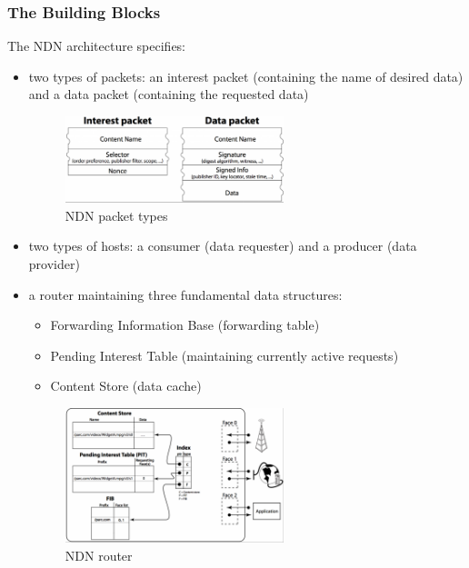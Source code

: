             \subsubsection{The Building Blocks}
                The NDN architecture specifies:
                    \begin{itemize}
                        \item two types of packets: an interest packet (containing the name of desired data) and a data packet (containing the requested data)
                        \begin{figure}[H]
                            \begin{center}
                                \includegraphics[width=0.6\textwidth]{fig/ndn_packets1.png}
                              \caption{NDN packet types}
                              \label{ndn-packets}
                            \end{center}
                        \end{figure}
                        \item two types of hosts: a consumer (data requester) and a producer (data provider)
                        \item a router maintaining three fundamental data structures:
                        \begin{itemize}
                            \item Forwarding Information Base (forwarding table)
                            \item Pending Interest Table (maintaining currently active requests)
                            \item Content Store (data cache)
                        \end{itemize}
                        \begin{figure}[H]
                            \begin{center}
                                \includegraphics[width=0.6\textwidth]{fig/ndn_router1.png}
                              \caption{NDN router}
                              \label{ndn-router1}
                            \end{center}
                        \end{figure}

                    \end{itemize}

